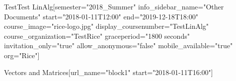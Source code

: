 \documentclass[12pt]{article}
\begin{document}




\def\defaultproblemattributes{attempts="1" showanswer="attempted" rerandomize="per_student"}

\begin{edXcourse}{Test}{Test LinAlg}[semester="2018_Summer" info_sidebar_name="Other Documents" start="2018-01-11T12:00" end="2019-12-18T18:00" course_image="rice-logo.jpg" display_coursenumber="TestLinAlg" course_organization="TestRice" graceperiod="1800 seconds" invitation_only="true" allow_anonymous="false" mobile_available="true"  org="Rice"]
 
%  


% 
 

 





\begin{edXchapter}{Vectors and Matrices}[url_name="block1" start="2018-01-11T16:00"]

\def\edxbaseoutputname{b1lineareqns}









% 




\endedxsequential

\def\edxbaseoutputname{b1rowreduced}


% 







\endedxsequential

\def\edxbaseoutputname{b1vectors}


\end{edXchapter}
\end{edXcourse}
\end{document}
